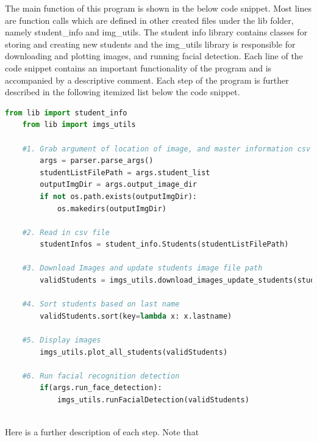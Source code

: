\documentclass[12pt, letterpaper, final, onecolumn, titlepage] {article}
\begin{document}
The main function of this program is shown in the below code snippet. Most lines are function calls which are defined in other created files under the lib folder, namely student\_info and img\_utils. The student info library contains classes for storing and creating new students and the img\_utils library is responsible for downloading and plotting images, and running facial detection. Each line of the code snippet contains an important functionality of the program and is accompanied by a descriptive comment. Each step of the program is further described in the following itemized list below the code snippet.

\singlespacing
\begin{lstlisting}[language=Python]
	from lib import student_info
	from lib import imgs_utils
	
	#1. Grab argument of location of image, and master information csv
		args = parser.parse_args()
		studentListFilePath = args.student_list
		outputImgDir = args.output_image_dir
		if not os.path.exists(outputImgDir):
			os.makedirs(outputImgDir)

	#2. Read in csv file
		studentInfos = student_info.Students(studentListFilePath)

	#3. Download Images and update students image file path
		validStudents = imgs_utils.download_images_update_students(studentInfos, outputImgDir)

	#4. Sort students based on last name
		validStudents.sort(key=lambda x: x.lastname)

	#5. Display images
		imgs_utils.plot_all_students(validStudents)

	#6. Run facial recognition detection
		if(args.run_face_detection):
			imgs_utils.runFacialDetection(validStudents)
	
\end{lstlisting}
\doublespacing
Here is a further description of each step. Note that
\end{document}
